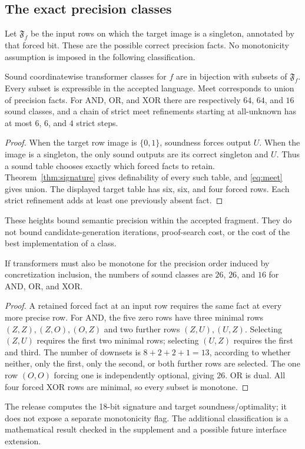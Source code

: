 \subsection{The exact precision classes}
Let $\mathfrak F_f$ be the input rows on which the target image is a singleton, annotated by that forced bit. These are the possible correct precision facts. No monotonicity assumption is imposed in the following classification.

\begin{theorem}\label{thm:precision}
Sound coordinatewise transformer classes for $f$ are in bijection with subsets of $\mathfrak F_f$. Every subset is expressible in the accepted language. Meet corresponds to union of precision facts. For AND, OR, and XOR there are respectively $64$, $64$, and $16$ sound classes, and a chain of strict meet refinements starting at all-unknown has at most $6$, $6$, and $4$ strict steps.
\end{theorem}
\begin{proof}
When the target row image is $\{0,1\}$, soundness forces output $U$. When the image is a singleton, the only sound outputs are its correct singleton and $U$. Thus a sound table chooses exactly which forced facts to retain. Theorem~\ref{thm:signature} gives definability of every such table, and \eqref{eq:meet} gives union. The displayed target table has six, six, and four forced rows. Each strict refinement adds at least one previously absent fact.
\end{proof}

These heights bound semantic precision within the accepted fragment. They do not bound candidate-generation iterations, proof-search cost, or the cost of the best implementation of a class.

\begin{proposition}\label{prop:monotoneclasses}
If transformers must also be monotone for the precision order induced by concretization inclusion, the numbers of sound classes are $26$, $26$, and $16$ for AND, OR, and XOR.
\end{proposition}
\begin{proof}
A retained forced fact at an input row requires the same fact at every more precise row. For AND, the five zero rows have three minimal rows $(Z,Z),(Z,O),(O,Z)$ and two further rows $(Z,U),(U,Z)$. Selecting $(Z,U)$ requires the first two minimal rows; selecting $(U,Z)$ requires the first and third. The number of downsets is $8+2+2+1=13$, according to whether neither, only the first, only the second, or both further rows are selected. The one row $(O,O)$ forcing one is independently optional, giving $26$. OR is dual. All four forced XOR rows are minimal, so every subset is monotone.
\end{proof}

The release computes the 18-bit signature and target soundness/optimality; it does not expose a separate monotonicity flag. The additional classification is a mathematical result checked in the supplement and a possible future interface extension.
